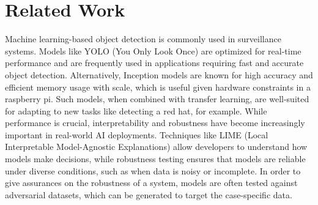 \section{Related Work}
Machine learning-based object detection is commonly used in surveillance systems.
Models like YOLO (You Only Look Once) are optimized for real-time performance and are frequently used in applications requiring fast and accurate object detection. 
Alternatively, Inception models are known for high accuracy and efficient memory usage with scale, which is useful given hardware constraints in a raspberry pi.
Such models, when combined with transfer learning, are well-suited for adapting to new tasks like detecting a red hat, for example. 
While performance is crucial, interpretability and robustness have become increasingly important in real-world AI deployments. 
Techniques like LIME (Local Interpretable Model-Agnostic Explanations) allow developers to understand how models make decisions, while robustness testing ensures that models are reliable under diverse conditions, such as when data is noisy or incomplete.
In order to give assurances on the robustness of a system, models are often tested against adversarial datasets, which can be generated to target the case-specific data.